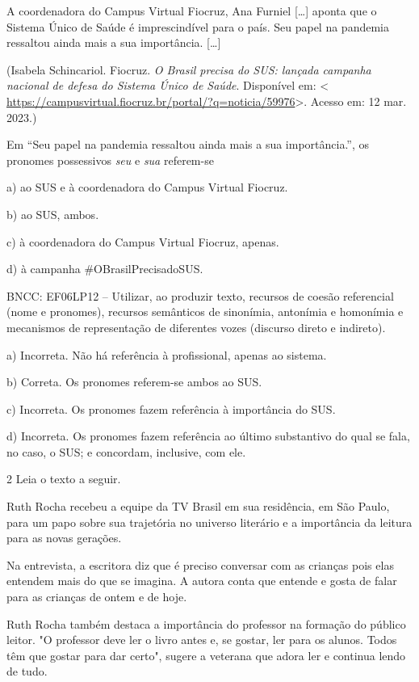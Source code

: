 A coordenadora do Campus Virtual Fiocruz, Ana Furniel {[}\ldots{]}
aponta que o Sistema Único de Saúde é imprescindível para o país. Seu
papel na pandemia ressaltou ainda mais a sua importância. {[}\ldots{]}

(Isabela Schincariol. Fiocruz. \emph{O Brasil precisa do SUS: lançada
campanha nacional de defesa do Sistema Único de Saúde}. Disponível em:
\textless{}
\url{https://campusvirtual.fiocruz.br/portal/?q=noticia/59976}\textgreater.
Acesso em: 12 mar. 2023.)

Em ``Seu papel na pandemia ressaltou ainda mais a sua importância.'', os
pronomes possessivos \emph{seu} e \emph{sua} referem-se

a) ao SUS e à coordenadora do Campus Virtual Fiocruz.

b) ao SUS, ambos.

c) à coordenadora do Campus Virtual Fiocruz, apenas.

d) à campanha \#OBrasilPrecisadoSUS.

BNCC: EF06LP12 -- Utilizar, ao produzir texto, recursos de coesão
referencial (nome e pronomes), recursos semânticos de sinonímia,
antonímia e homonímia e mecanismos de representação de diferentes vozes
(discurso direto e indireto).

a) Incorreta. Não há referência à profissional, apenas ao sistema.

b) Correta. Os pronomes referem-se ambos ao SUS.

c) Incorreta. Os pronomes fazem referência à importância do SUS.

d) Incorreta. Os pronomes fazem referência ao último substantivo do qual
se fala, no caso, o SUS; e concordam, inclusive, com ele.

\num{2} Leia o texto a seguir.

Ruth Rocha recebeu a equipe da TV Brasil em sua residência, em São
Paulo, para um papo sobre sua trajetória no universo literário e a
importância da leitura para as novas gerações.

Na entrevista, a escritora diz que é preciso conversar com as crianças
pois elas entendem mais do que se imagina. A autora conta que entende e
gosta de falar para as crianças de ontem e de hoje.

Ruth Rocha também destaca a importância do professor na formação do
público leitor. "O professor deve ler o livro antes e, se gostar, ler
para os alunos. Todos têm que gostar para dar certo", sugere a veterana
que adora ler e continua lendo de tudo.

